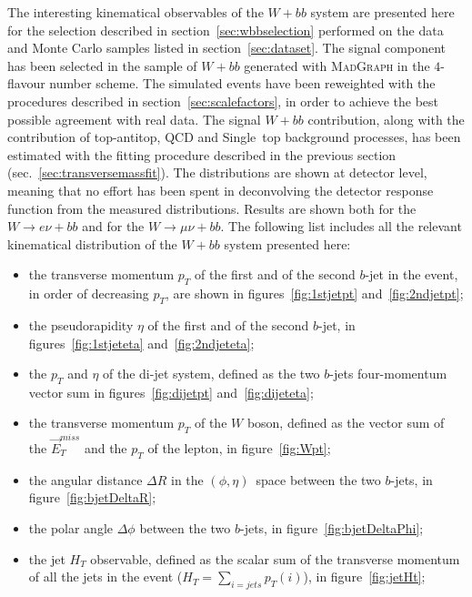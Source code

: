 The interesting kinematical observables of the $W + bb$ system are presented here
for the selection described in section~\ref{sec:wbbselection} performed on the 
data and Monte Carlo samples listed in section~\ref{sec:dataset}.
The signal component has been selected in the sample of $W + bb$ generated with 
\textsc{MadGraph} in the $4$-flavour number scheme.
The simulated events have been reweighted with the procedures 
described in section~\ref{sec:scalefactors},
in order to achieve the best possible 
agreement with real data.
The signal $W + bb$ contribution, along with the contribution of top-antitop, QCD and 
Single~top background processes, has been estimated with the fitting procedure 
described in the previous section (sec.~\ref{sec:transversemassfit}).
The distributions are shown at detector level, 
meaning that no effort has been spent in
deconvolving the detector response function from the measured distributions.
Results are shown both for the $W \rightarrow e \nu + bb$ and for the 
$W \rightarrow \mu \nu + bb$.
The following list includes all the relevant kinematical distribution of 
the $W + bb$ system presented here:
\begin{itemize}
  \item the transverse momentum $p_{T}$ of the first and of the second $b$-jet
    in the event, in order of decreasing $p_{T}$, are shown in 
    figures~\ref{fig:1stjetpt} and~\ref{fig:2ndjetpt};
  \item the pseudorapidity $\eta$ of the first and of the second $b$-jet, 
    in figures~\ref{fig:1stjeteta} and~\ref{fig:2ndjeteta};
  \item the $p_{T}$ and $\eta$ of the di-jet system, defined as the 
     two $b$-jets four-momentum vector sum in figures~\ref{fig:dijetpt} and~\ref{fig:dijeteta};
  \item the transverse momentum $p_{T}$ of the $W$ boson, defined as the 
    vector sum of the $\vec{E}_{T}^{miss}$ and the $p_{T}$ of the lepton,
    in figure~\ref{fig:Wpt};
  \item the angular distance $\Delta R$ in the $(\phi,\eta)$~space between the two 
    $b$-jets, in figure~\ref{fig:bjetDeltaR};
  \item the polar angle $\Delta \phi$ between the two 
    $b$-jets, in figure~\ref{fig:bjetDeltaPhi};
  \item the jet $H_{T}$ observable, defined as the scalar sum of the 
    transverse momentum of all the jets in the event ($H_{T} = \sum_{i = jets} p_{T}(i)$),
    in figure~\ref{fig:jetHt};
\end{itemize}

